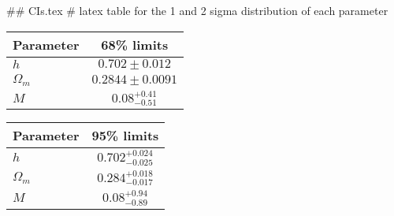 ## CIs.tex
# latex table for the 1 and 2 sigma distribution of each parameter

\begin{tabular} { l  c}
 Parameter &  68\% limits\\
\hline
{\boldmath$h              $} & $0.702\pm 0.012            $\\
{\boldmath$\Omega_m       $} & $0.2844\pm 0.0091          $\\
{\boldmath$M              $} & $0.08^{+0.41}_{-0.51}      $\\
\hline
\end{tabular}

\begin{tabular} { l  c}
 Parameter &  95\% limits\\
\hline
{\boldmath$h              $} & $0.702^{+0.024}_{-0.025}   $\\
{\boldmath$\Omega_m       $} & $0.284^{+0.018}_{-0.017}   $\\
{\boldmath$M              $} & $0.08^{+0.94}_{-0.89}      $\\
\hline
\end{tabular}
